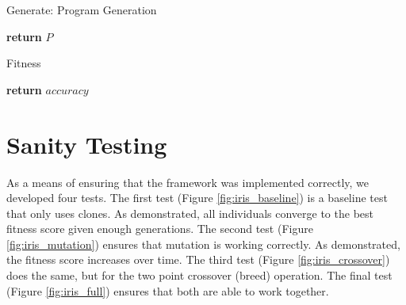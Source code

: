 \documentclass[12pt, final]{dalcsthesis}
\begin{document}
\begin{algorithm}[hb]
	\caption{Generate: Program Generation}
	\label{alg:generate}
	\begin{algorithmic}[1]
		\State \textbf{return} $P$
		\EndProcedure
	\end{algorithmic}
\end{algorithm}

\begin{algorithm}[hb]
	\caption{Fitness}
	\label{alg:fitness-baseline}
	\begin{algorithmic}[1]
		\EndIf
		\EndFor
		\State \textbf{return} $accuracy$
		\EndProcedure
	\end{algorithmic}
\end{algorithm}

\section{Sanity Testing}
As a means of ensuring that the framework was implemented correctly, we developed four tests.
The first test (Figure \ref{fig:iris_baseline}) is a baseline test that only uses clones. As demonstrated,
all individuals converge to the best fitness score given enough generations. The second test (Figure \ref{fig:iris_mutation})
ensures that mutation is working correctly. As demonstrated, the fitness score increases over time. The third test (Figure \ref{fig:iris_crossover})
does the same, but for the two point crossover (breed) operation. The final test (Figure \ref{fig:iris_full}) ensures that both
are able to work together.
\end{document}
